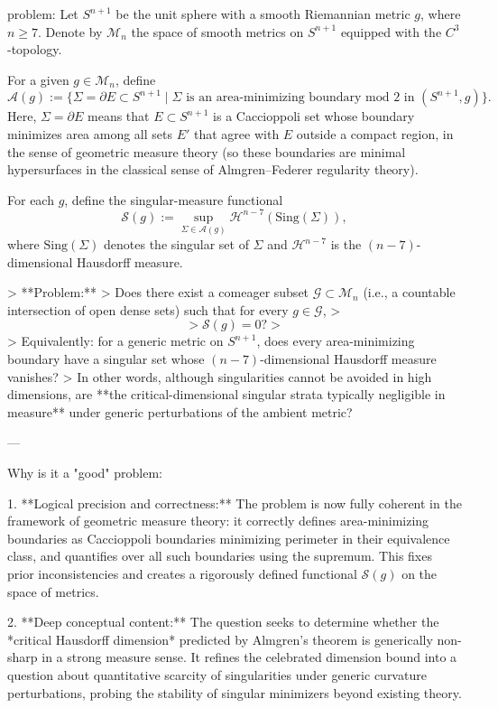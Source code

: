 problem:  
Let \(S^{n+1}\) be the unit sphere with a smooth Riemannian metric \(g\), where \(n \ge 7\).  
Denote by \(\mathcal{M}_n\) the space of smooth metrics on \(S^{n+1}\) equipped with the \(C^3\)-topology.  

For a given \(g \in \mathcal{M}_n\), define  
\[
\mathcal{A}(g) := \{ \Sigma = \partial E \subset S^{n+1} \mid \Sigma \text{ is an area-minimizing boundary mod } 2 \text{ in } (S^{n+1}, g) \}.
\]
Here, \(\Sigma = \partial E\) means that \(E \subset S^{n+1}\) is a Caccioppoli set whose boundary minimizes area among all sets \(E'\) that agree with \(E\) outside a compact region, in the sense of geometric measure theory (so these boundaries are minimal hypersurfaces in the classical sense of Almgren–Federer regularity theory).

For each \( g \), define the singular-measure functional
\[
\mathcal{S}(g) := \sup_{\Sigma \in \mathcal{A}(g)} \mathcal{H}^{n-7}(\mathrm{Sing}(\Sigma)),
\]
where \(\mathrm{Sing}(\Sigma)\) denotes the singular set of \(\Sigma\) and \(\mathcal{H}^{n-7}\) is the \((n-7)\)-dimensional Hausdorff measure.

> **Problem:**  
> Does there exist a comeager subset \( \mathcal{G} \subset \mathcal{M}_n \) (i.e., a countable intersection of open dense sets) such that for every \( g \in \mathcal{G} \),
> \[
> \mathcal{S}(g) = 0?
> \]
> Equivalently: for a generic metric on \(S^{n+1}\), does every area-minimizing boundary have a singular set whose \((n-7)\)-dimensional Hausdorff measure vanishes?  
> In other words, although singularities cannot be avoided in high dimensions, are **the critical-dimensional singular strata typically negligible in measure** under generic perturbations of the ambient metric?

---

Why is it a "good" problem:  

1. **Logical precision and correctness:**  
   The problem is now fully coherent in the framework of geometric measure theory: it correctly defines area-minimizing boundaries as Caccioppoli boundaries minimizing perimeter in their equivalence class, and quantifies over all such boundaries using the supremum. This fixes prior inconsistencies and creates a rigorously defined functional \(\mathcal{S}(g)\) on the space of metrics.

2. **Deep conceptual content:**  
   The question seeks to determine whether the *critical Hausdorff dimension* predicted by Almgren’s theorem is generically non-sharp in a strong measure sense. It refines the celebrated dimension bound into a question about quantitative scarcity of singularities under generic curvature perturbations, probing the stability of singular minimizers beyond existing theory.

